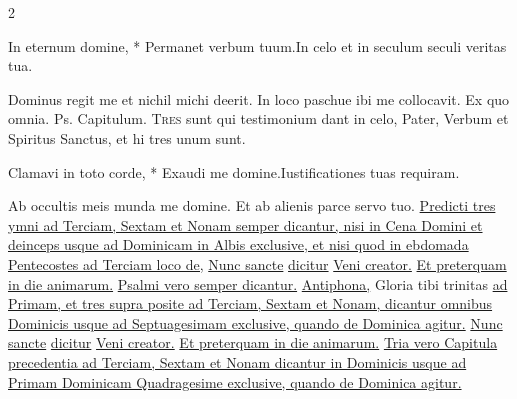 \begin{multicols*}{2}
\begin{responsory-breve}
{In eternum domine, * Permanet verbum tuum.}{In celo et in seculum seculi veritas tua.}
\end{responsory-breve}%
\newline \V Dominus regit me et nichil michi deerit.
\newline \R In loco paschue ibi me collocavit.
 Ex quo omnia. {\color{Red} Ps.}    {\color{Red} Capitulum.}
\lettrine[lines=2]{\zallmancaps \color{Red} T}{res} sunt qui testimonium dant in celo, Pater, Verbum et Spiritus Sanctus, et hi tres unum sunt.
\begin{responsory-breve}
{Clamavi in toto corde, * Exaudi me domine.}{Iustificationes tuas requiram.}
\end{responsory-breve}%
\newline \V Ab occultis meis munda me domine.
\newline \R Et ab alienis parce servo tuo.
\newline \ul{Predicti tres ymni ad Terciam, Sextam et Nonam semper dicantur, nisi in Cena Domini et deinceps usque ad Dominicam in Albis exclusive, et nisi quod in ebdomada Pentecostes ad Terciam loco de,} \hyperlink{nunc-sancte}{Nunc sancte} \ul{dicitur} \hyperlink{veni-creator-spiritus}{Veni creator.} \ul{Et preterquam in die animarum.}
\newline \ul{Psalmi vero semper dicantur.}
\newline \ul{Antiphona,} Gloria tibi trinitas \ul{ad Primam, et tres supra posite ad Terciam, Sextam et Nonam, dicantur omnibus Dominicis usque ad Septuagesimam exclusive, quando de Dominica agitur.} \hyperlink{nunc-sancte}{Nunc sancte} \ul{dicitur} \hyperlink{veni-creator-spiritus}{Veni creator.} \ul{Et preterquam in die animarum.}
\newline \ul{Tria vero Capitula precedentia ad Terciam, Sextam et Nonam dicantur in Dominicis usque ad Primam Dominicam Quadragesime exclusive, quando de Dominica agitur.}

\end{multicols*}
